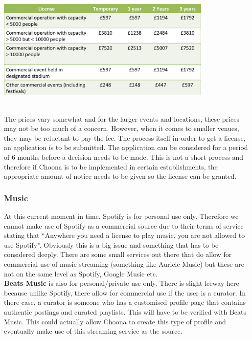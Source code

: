 \begin{minipage}{\linewidth}
\centering
\includegraphics[width=0.8\textwidth]{./img/table_license.png}
\label{fig:license_prices}
\end{minipage}\\

The prices vary somewhat and for the larger events and locations, these prices may not be too much of a concern.  However, when it comes to smaller venues, they may be reluctant to pay the fee.  The process itself in order to get a license, an application is to be submitted.  The application can be considered for a period of 6 months before a decision needs to be made.   This is not a short process and therefore if Choona is to be implemented in certain establishments, the appropriate amount of notice needs to be given so the license can be granted.  

\subsubsection{Music}
At this current moment in time, Spotify is for personal use only.  Therefore we cannot make use of Spotify as a commercial source due to their terms of service stating that ``Anywhere you need a license to play music, you are not allowed to use Spotify''.  Obviously this is a big issue and something that has to be considered deeply.  There are some small services out there that do allow for commercial use of music streaming (something like Auricle Music) but these are not on the same level as Spotify, Google Music etc.  \\
\textbf{Beats Music} is also for personal/private use only.  There is slight leeway here because unlike Spotify, there allow for commercial use if the user is a curator.  In there case, a curator is someone who has a customised profile page that contains authentic postings and curated playlists.  This will have to be verified with Beats Music.  This could actually allow Choona to create this type of profile and eventually make use of this streaming service as the source.  

